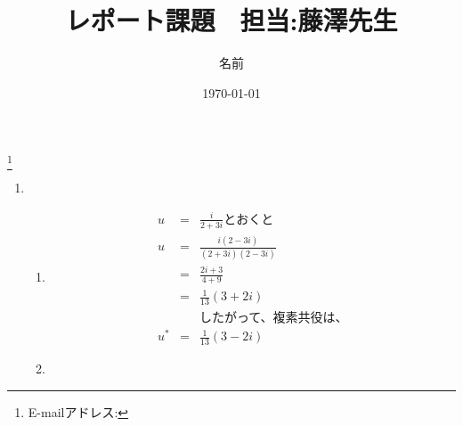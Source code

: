 \documentclass{jsarticle}
\title{レポート課題　担当:藤澤先生}
\date{\today}
\author{名前}
\begin{document}
\maketitle
\center
\thanks{E-mailアドレス:}
\newpage


\begin{enumerate}
  \renewcommand{\labelenumii}{\[\arabic{enumii}\]}
\item
  
  \begin{enumerate}
    \renewcommand{\labelenumii}{(\arabic{enumii})}
  \item
    \begin{eqnarray*}
      u &=& \frac{i}{2+3i} \mbox{とおくと}\\
      u &=& \frac{i(2-3i)}{(2+3i)(2-3i)}\\
      &=& \frac{2i+3}{4+9}\\
      &=& \frac{1}{13}(3+2i)\\
      &&\mbox{したがって、複素共役は、}\\
      u^* &=& \frac{1}{13}(3-2i)
    \end{eqnarray*}
  \item
  \end{enumerate}
\end{enumerate}
\end{document}
